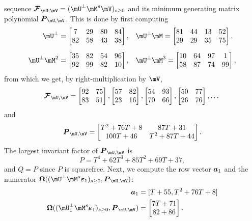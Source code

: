 \documentclass[12pt]{article}
\newcommand{\mat}[1]{\bm{\MakeUppercase{#1}}} %
\newcommand{\row}[1]{\bm{\MakeLowercase{#1}}} %
\newcommand{\col}[1]{\bm{\MakeLowercase{#1}}} %
\newcommand{\seq}{\mat{\mathcal{F}}} %
\begin{document}
sequence $\seq_{\mU,\mV} = (\mU^{\perp}\mM^s\mV)_{s\ge0}$ and its
minimum generating matrix polynomial $\mat{P}_{\mU,\mV}$. This is done
by first computing
\begin{align}\label{exampleproducts}
\mU^\perp =
\begin{bmatrix}
  7&  29&  80&  84\\
 82&  58&  43&  38
\end{bmatrix},
& 
\quad \mU^\perp \mM 
=
\begin{bmatrix}
 81&  44&  13&  52\\
 29&  29&  35&  75
\end{bmatrix},
 \\[2mm]
\mU^\perp \mM^2 
=
\begin{bmatrix}
35&  82&  54&  96\\
92&  99&  82&  10
\end{bmatrix},
 &\quad \mU^\perp \mM^3 
=
\begin{bmatrix}
10&  64&  97&   1\\
58&  87&  74&  99
\end{bmatrix}, \nonumber
\end{align}
from which we get, by right-multiplication by $\mV$,
$$ \seq_{\mU,\mV} =
\begin{bmatrix}
92& 75\\  
83& 51
\end{bmatrix},
\begin{bmatrix}
57& 82\\  
23& 16
\end{bmatrix},
\begin{bmatrix}
54& 93\\  
70& 66
\end{bmatrix},
\begin{bmatrix}
50& 77\\
26& 76
\end{bmatrix},\dots
$$
and
$$ \mat{P}_{\mU,\mV} =
\begin{bmatrix}
T^2 + 76T + 8&       87T + 31\\
    100T + 46& T^2 + 87T + 44
\end{bmatrix}.
$$
The largest invariant factor of $\mat{P}_{\mU,\mV}$ is 
$$P = T^4 + 62T^3 + 85T^2 + 69T + 37,$$
and $Q=P$
since $P$ is squarefree. 
Next, we compute the row vector $\row{a}_1$ and the numerator $\mat{\Omega}( (\mU^\perp \mM^s\col{\varepsilon}_1)_{s \ge 0}, \mat{P}_{\mU,\mV})$:
\begin{align*}
\row{a}_1 &= [T + 55, T^2 + 76T+ 8]\\
\mat{\Omega}( (\mU^\perp_1 \mM^s\col{\varepsilon}_1)_{s \ge 0}, \mat{P}_{\mU,\mV}) 
&=\left [\begin{matrix} 7T + 71 \\ 82 + 86   \end{matrix}\right ].
\end{align*}
\end{document}
